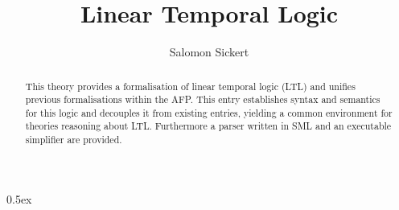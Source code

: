 \documentclass[11pt,a4paper]{article}
\begin{document}
\title{Linear Temporal Logic}
\author{Salomon Sickert}
\maketitle

\begin{abstract}
This theory provides a formalisation of linear temporal logic (LTL) and unifies previous formalisations within the AFP. This entry establishes syntax and semantics for this logic and decouples it from existing  entries, yielding a common environment for theories reasoning about LTL. Furthermore a parser written in SML and an executable simplifier are provided.
\end{abstract}

\tableofcontents

\parindent 0pt\parskip 0.5ex





\end{document}
